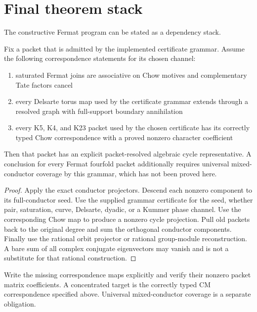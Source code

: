 \chapter{Final theorem stack}
The constructive Fermat program can be stated as a dependency stack.

\begin{theorem}
Fix a packet that is admitted by the implemented certificate grammar. Assume the following correspondence statements for its chosen channel:
\begin{enumerate}
\item saturated Fermat joins are associative on Chow motives and complementary Tate factors cancel
\item every Delsarte torus map used by the certificate grammar extends through a resolved graph with full-support boundary annihilation
\item every K5, K4, and K23 packet used by the chosen certificate has its correctly typed Chow correspondence with a proved nonzero character coefficient
\end{enumerate}
Then that packet has an explicit packet-resolved algebraic cycle representative. A conclusion for every Fermat fourfold packet additionally requires universal mixed-conductor coverage by this grammar, which has not been proved here.
\end{theorem}
\begin{proof}
Apply the exact conductor projectors. Descend each nonzero component to its full-conductor seed. Use the supplied grammar certificate for the seed, whether pair, saturation, curve, Delsarte, dyadic, or a Kummer phase channel. Use the corresponding Chow map to produce a nonzero cycle projection. Pull old packets back to the original degree and sum the orthogonal conductor components. Finally use the rational orbit projector or rational group-module reconstruction. A bare sum of all complex conjugate eigenvectors may vanish and is not a substitute for that rational construction.
\end{proof}

\begin{openproblem}
Write the missing correspondence maps explicitly and verify their nonzero packet matrix coefficients. A concentrated target is the correctly typed CM correspondence specified above. Universal mixed-conductor coverage is a separate obligation.
\end{openproblem}

